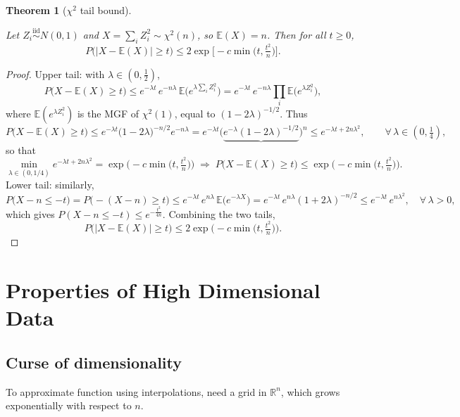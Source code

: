\documentclass[
  letterpaper,
  DIV=11,
  numbers=noendperiod]{scrreprt}
\theoremstyle{definition}
\theoremstyle{plain}
\newtheorem{theorem}{Theorem}[chapter]
\theoremstyle{plain}
\theoremstyle{definition}
\theoremstyle{plain}
\theoremstyle{plain}
\theoremstyle{remark}
\begin{document}
\begin{theorem}[\(\chi^2\) tail
bound]\protect\hypertarget{thm-chi2-tail}{}\label{thm-chi2-tail}

Let \(Z_i \overset{\text{iid}}{\sim} N(0,1)\) and
\(X = \sum_i Z_i^2 \sim \chi^2(n)\), so \(\mathbb{E}(X) = n\). Then for
all \(t \ge 0\), \[
P\big(|X - \mathbb{E}(X)| \ge t\big) \le 2\exp\!\Big[-c \min\big(t, \tfrac{t^2}{n}\big)\Big].
\]

\end{theorem}

\begin{proof}
Upper tail: with \(\lambda \in (0, \tfrac12)\), \[
P\big(X - \mathbb{E}(X) \ge t\big) \le e^{-\lambda t}\, e^{-n\lambda}\, \mathbb{E}\big(e^{\lambda \sum_i Z_i^2}\big)
= e^{-\lambda t}\, e^{-n\lambda} \prod_i \mathbb{E}\big(e^{\lambda Z_i^2}\big),
\] where \(\mathbb{E}(e^{\lambda Z_i^2})\) is the MGF of \(\chi^2(1)\),
equal to \((1 - 2\lambda)^{-1/2}\). Thus \[
P\big(X - \mathbb{E}(X) \ge t\big) \le e^{-\lambda t}\big(1 - 2\lambda\big)^{-n/2} e^{-n\lambda}
= e^{-\lambda t}\Big(\underbrace{e^{-\lambda}(1 - 2\lambda)^{-1/2}}\Big)^{n}
\le e^{-\lambda t + 2 n \lambda^2}, \qquad \forall\, \lambda \in (0, \tfrac14),
\] so that \[
\min_{\lambda \in (0, 1/4)} e^{-\lambda t + 2 n \lambda^2} = \exp\!\Big(-c \min\big(t, \tfrac{t^2}{n}\big)\Big)
\;\Longrightarrow\;
P\big(X - \mathbb{E}(X) \ge t\big) \le \exp\!\Big(-c \min\big(t, \tfrac{t^2}{n}\big)\Big).
\] Lower tail: similarly, \[
P\big(X - n \le -t\big) = P\big(-(X - n) \ge t\big) \le e^{-\lambda t}\, e^{n\lambda}\, \mathbb{E}\big(e^{-\lambda X}\big)
= e^{-\lambda t}\, e^{n\lambda}(1 + 2\lambda)^{-n/2}
\le e^{-\lambda t}\, e^{n \lambda^2}, \quad \forall\, \lambda > 0,
\] which gives \(P(X - n \le -t) \le e^{-\frac{t^2}{4n}}\). Combining
the two tails, \[
P\big(|X - \mathbb{E}(X)| \ge t\big) \le 2\exp\!\Big(-c \min\big(t, \tfrac{t^2}{n}\big)\Big).
\]
\end{proof}

\chapter{Properties of High Dimensional
Data}\label{properties-of-high-dimensional-data}

\section{Curse of dimensionality}\label{curse-of-dimensionality}

To approximate function using interpolations, need a grid in
\(\mathbb{R}^n\), which grows exponentially with respect to \(n\).
\end{document}
